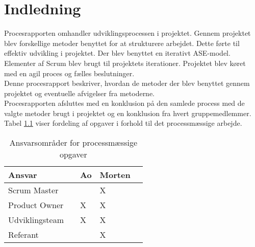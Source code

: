 \chapter{Indledning}
Procesrapporten omhandler udviklingsprocessen i projektet. Gennem projektet blev
forskellige metoder benyttet for at strukturere arbejdet. Dette førte til effektiv
udvikling i projektet.
Der blev benyttet en iterativt ASE-model. Elementer af Scrum blev brugt til
projektets iterationer. Projektet blev køret med en agil proces og fælles beslutninger. \\
Denne procesrapport beskriver, hvordan de metoder der blev benyttet gennem
projektet og eventuelle afvigelser fra metoderne. \\ 
Procesrapporten afsluttes med en konklusion på den samlede process med de valgte metoder brugt i projektet og en konklusion fra hvert gruppemedlemmer. \\
Tabel \ref{ProcessTabel} viser fordeling af opgaver i forhold til det processmæssige arbejde.

\begin{table}[H]
	\centering
	\begin{tabular}{lllll} \hline
		\textbf{Ansvar} &  & \textbf{Ao}&  \textbf{Morten}&  \\ \hline
		Scrum Master&  &  &  X&  \\ \hline
		Product Owner&  &  X&  X& \\ \hline
		Udviklingsteam& & X& X& \\  \hline
		Referant& & & X& \\ \hline
	\end{tabular}
	\caption{Ansvarsområder for processmæssige opgaver}
	\label{ProcessTabel}
\end{table}